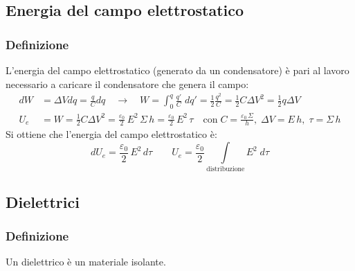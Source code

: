 \documentclass[a4paper]{article}
\begin{document}
\newpage

\subsection{Energia del campo elettrostatico}
\subsubsection*{Definizione}
L'energia del campo elettrostatico (generato da un condensatore) è pari al lavoro necessario a caricare il condensatore che genera
il campo:
\begin{align*}
	dW &= \Delta V dq = \frac{q}{C} dq \quad \rightarrow \quad W = \int_0^{q} \frac{q'}{C} \; dq' = \frac{1}{2} \frac{q^2}{C} = \frac{1}{2} C \Delta V^2 = \frac{1}{2} q \Delta V \\
	U_e &= W = \frac{1}{2} C \Delta V^2 = \frac{\varepsilon_0}{2} \, E^2 \, \Sigma \, h = \frac{\varepsilon_0}{2} \, E^2 \, \tau \quad \text{con} \; C = \frac{\varepsilon_0 \, \Sigma}{h}, \; \Delta V = E \, h, \; \tau = \Sigma \, h
\end{align*}
Si ottiene che l'energia del campo elettrostatico è:
\[dU_e = \frac{\varepsilon_0}{2} \, E^2 \, d\tau \qquad U_e = \frac{\varepsilon_0}{2} \int \limits_\text{distribuzione} E^2 \; d\tau\]

\subsection{Dielettrici}
\subsubsection*{Definizione}
Un dielettrico è un materiale isolante.
\end{document}
